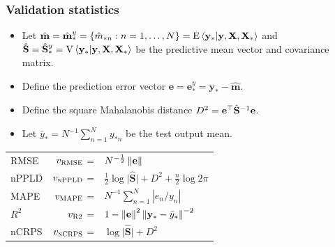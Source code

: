 \documentclass{snedecorbeamer}
\begin{document}
\begin{frame}%
  \label{frm:validation}
  \frametitle{Validation statistics}

  \newcommand{\predmean}{\hat{\mathbf{m}}^{y}_*}
  \newcommand{\predvar}{\hat{\mathbf{S}}^{y}_*}
  \newcommand{\postpred}{\hat{p}^{y}_*}

  \begin{itemize}
  \item   Let
    $\hat{\mathbf{m}} = \predmean = \{\hat{m}_{*n}: n = 1, \dots, N\} =
    \EV{\mathbf{y}_* | \mathbf{y}, \mathbf{X}, \mathbf{X}_*}$
    and
    $\hat{\mathbf{S}} = \predvar = \VV{\mathbf{y}_* |
      \mathbf{y}, \mathbf{X}, \mathbf{X}_*}$
    be the predictive mean vector and covariance matrix.
  \item  Define the
    prediction error vector $\mathbf{e} = \mathbf{e}_{*}^{y} =
    \mathbf{y}_{*} - \hat{\mathbf{m}}$.
  \item Define the square Mahalanobis distance $D^2
    = \mathbf{e}^{\top} \hat{\mathbf{S}}^{-1} \mathbf{e}$.
  \item   Let $\bar{y}_* = N^{-1} \sum_{n=1}^{N} y_{*n}$ be the test output
    mean.
  \end{itemize}

  \begin{center}
    \begin{tabular}{lrl}
      RMSE
      & $v_{\textsc{RMSE}}$ =
      & $N^{-\frac{1}{2}} \left\lVert\mathbf{e}\right\rVert$ \\
      nPPLD
      & $v_{\textsc{nPPLD}}$ =
      & $
        \frac{1}{2} \log \lvert \hat{\mathbf{S}} \rvert
        +D^2
        +\frac{n}{2} \log 2 \pi
        $
      \\
      MAPE
      & $v_{\textsc{MAPE}}$ =
      & $N^{-1} \sum_{n = 1}^{N} |e_n / y_n|$ \\
      $R^2$
      & $v_{\textsc{R2}} $ =
      & $1 -%
        \norm{\mathbf{e}}^{2}
        \norm{\mathbf{y}_* - \bar{y}_*}^{-2}$ \\
      nCRPS
      & $v_{\textsc{nCRPS}}$ =
      & $
        \log \lvert \hat{\mathbf{S}} \rvert%
        +D^2
        $
    \end{tabular}
  \end{center}
\end{frame}
\end{document}
